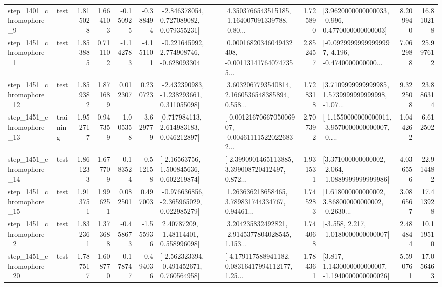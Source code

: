 \begin{tabular}{llrrrrllrlrr}
  step\_1401\_chromophore\_9 &      test &      1.815028 &    1.664103 &     -0.150925 & -0.388494 &    [-2.846378054, 0.727089082, 0.079355231] &  [4.3503766543515185, -1.164007091339788, -0.80... &       1.725890 &   [3.9620000000000033, -0.996, 0.4770000000000003] &            8.209940 &         16.810218 \\
  step\_1451\_chromophore\_1 &      test &      1.853885 &    0.711102 &     -1.142783 & -4.151101 &   [-0.221645992, 2.774908746, -0.628093304] &  [0.00016820346049432408, -0.001131417640747355... &       2.852457 &  [-0.09299999999999997, 4.196, -0.4740000000000... &            7.062988 &         25.997612 \\
 step\_1451\_chromophore\_12 &      test &      1.859382 &    1.871689 &      0.012307 &  0.230723 &   [-2.432390983, -1.238293661, 0.311055098] &  [3.6032067793540814, 2.1660536548385894, 0.558... &       1.728318 &  [3.7109999999999985, 1.5739999999999998, -1.07... &            9.322508 &         23.886314 \\
 step\_1451\_chromophore\_13 &  training &      1.952717 &    0.947359 &     -1.005358 & -3.629779 &     [0.717984113, 2.614983183, 0.046212897] &  [-0.0012167066705006907, -0.004611115220226832... &       2.707392 &  [-1.1550000000000011, -3.9570000000000007, -0.... &            1.044262 &          6.612502 \\
 step\_1451\_chromophore\_14 &      test &      1.861233 &    1.677709 &     -0.183524 & -0.512158 &     [-2.16563756, 1.500845636, 0.602219874] &  [-2.3990901465113885, 3.399008720412497, 0.872... &       1.931531 &   [3.371000000000002, -2.064, -1.0889999999999986] &            4.036556 &         22.914482 \\
 step\_1451\_chromophore\_15 &      test &      1.913751 &    1.996251 &      0.082501 &  0.497003 &   [-0.976636856, -2.365965029, 0.022985279] &  [1.263636218658465, 3.789831744334767, 0.94461... &       1.745283 &  [1.618000000000002, 3.868000000000002, -0.2630... &            3.086567 &         17.413928 \\
  step\_1451\_chromophore\_2 &      test &      1.832361 &    1.373688 &     -0.458673 & -1.555936 &      [2.40787209, -1.48114401, 0.558996098] &  [3.204235832492821, -2.9145377804028545, 1.153... &       1.744068 &               [-3.558, 2.217, -1.0180000000000007] &            2.484844 &         10.119510 \\
 step\_1451\_chromophore\_20 &      test &      1.787517 &    1.608770 &     -0.178747 & -0.494036 &   [-2.562323394, -0.491452671, 0.760564958] &  [-4.179117588941182, 0.08316417994112177, 1.25... &       1.784361 &   [3.817, 1.1430000000000007, -1.1940000000000026] &            5.590761 &         17.056463 \\

\end{tabular}
